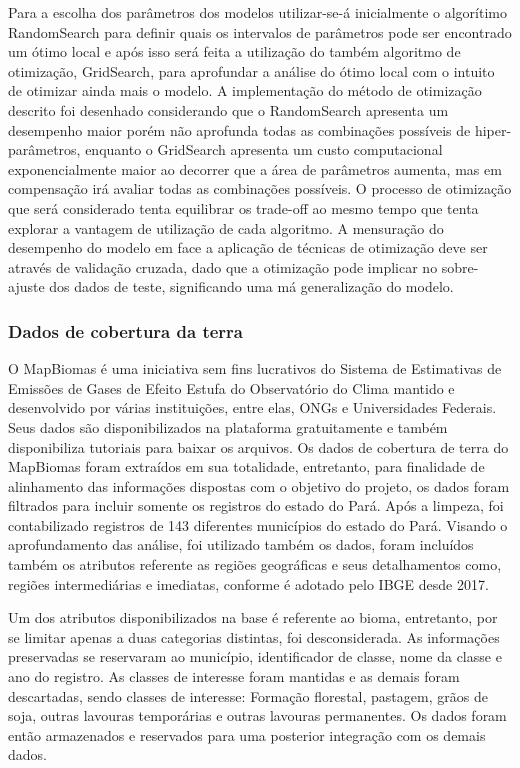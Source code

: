 Para a escolha dos parâmetros dos modelos utilizar-se-á inicialmente o algorítimo RandomSearch para definir quais os intervalos de parâmetros pode ser encontrado um ótimo local e após isso será feita a utilização do também algoritmo de otimização, GridSearch, para aprofundar a análise do ótimo local com o intuito de otimizar ainda mais o modelo. A implementação do método de otimização descrito foi desenhado considerando que o RandomSearch apresenta um desempenho maior porém não aprofunda todas as combinações possíveis de hiper-parâmetros, enquanto o GridSearch apresenta um custo computacional exponencialmente maior ao decorrer que a área de parâmetros aumenta, mas em compensação irá avaliar todas as combinações possíveis. O processo de otimização que será considerado tenta equilibrar os trade-off ao mesmo tempo que tenta explorar a vantagem de utilização de cada algoritmo. A mensuração do desempenho do modelo em face a aplicação de técnicas de otimização deve ser através de validação cruzada, dado que a otimização pode implicar no sobre-ajuste dos dados de teste, significando uma má generalização do modelo.

\subsubsection{Dados de cobertura da terra}

O MapBiomas é uma iniciativa sem fins lucrativos do Sistema de Estimativas de Emissões de Gases de Efeito Estufa do Observatório do Clima mantido e desenvolvido por várias instituições, entre elas, ONGs e Universidades Federais. Seus dados são disponibilizados na plataforma gratuitamente e também disponibiliza tutoriais para baixar os arquivos. Os dados de cobertura de terra do MapBiomas foram extraídos em sua totalidade, entretanto, para finalidade de alinhamento das informações dispostas com o objetivo do projeto, os dados foram filtrados para incluir somente os registros do estado do Pará. Após a limpeza, foi contabilizado registros de 143 diferentes municípios do estado do Pará. Visando o aprofundamento das análise, foi utilizado também os dados, foram incluídos também os atributos referente as regiões geográficas e seus detalhamentos como, regiões intermediárias e imediatas, conforme é adotado pelo IBGE desde 2017. 

Um dos atributos disponibilizados na base é referente ao bioma, entretanto, por se limitar apenas a duas categorias distintas, foi desconsiderada. As informações preservadas se reservaram ao município, identificador de classe, nome da classe e ano do registro. As classes de interesse foram mantidas e as demais foram descartadas, sendo classes de interesse: Formação florestal, pastagem, grãos de soja, outras lavouras temporárias e outras lavouras permanentes. Os dados foram então armazenados e reservados para uma posterior integração com os demais dados.

